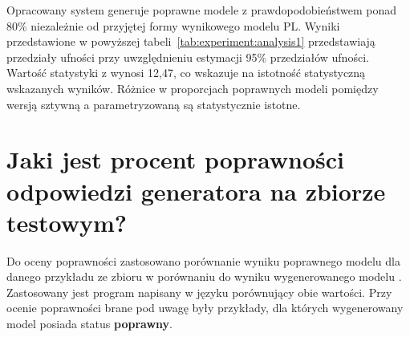 Opracowany system generuje poprawne modele z prawdopodobieństwem ponad 80\% niezależnie od przyjętej formy wynikowego modelu PL. Wyniki przedstawione w powyższej tabeli~\ref{tab:experiment:analysis1} przedstawiają przedziały ufności przy uwzględnieniu estymacji 95\% przedziałów  ufności. Wartość statystyki z wynosi 12,47, co wskazuje na istotność statystyczną wskazanych wyników. Różnice w proporcjach poprawnych modeli pomiędzy wersją sztywną a parametryzowaną są statystycznie istotne.


\section{Jaki jest procent poprawności odpowiedzi generatora na zbiorze testowym?}



Do oceny poprawności zastosowano porównanie wyniku poprawnego modelu  dla danego przykładu ze zbioru w porównaniu do wyniku wygenerowanego modelu . Zastosowany jest program napisany w języku  porównujący obie wartości. Przy ocenie poprawności brane pod uwagę były przykłady, dla których wygenerowany model posiada status \textbf{poprawny}.


